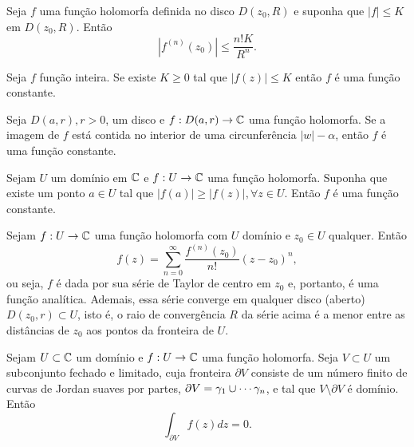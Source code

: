 \begin{corolario}
Seja $f$ uma função holomorfa definida no disco $D(z_0, R)$ e suponha que
$|f|\leq K$ em $D(z_0, R)$. Então
\begin{equation*}
    |f^{(n)}(z_0)| \leq \frac{n!K}{R^n}.
\end{equation*}
\end{corolario}


\begin{corolario}
Seja $f$ função inteira. Se existe $K\geq 0$ tal que $|f(z)|\leq K$ então $f$ é uma função constante.
\end{corolario}


\begin{lema}
Seja $D(a,r), r>0$, um disco e $f: D(a,r)\to\mathbb{C}$ uma função holomorfa. 
Se a imagem de $f$ está contida no interior de uma circunferência $|w| - \alpha$, então $f$ é uma função constante.
\end{lema}


\begin{corolario}
Sejam $U$ um domínio em $\mathbb{C}$ e $f:U\to\mathbb{C}$ uma função holomorfa.
Suponha que existe um ponto $a\in U$ tal que $|f(a)| \geq |f(z)|, \forall z\in U$. Então $f$ é uma função constante.
\end{corolario}


\begin{teorema}
Sejam $f:U\to\mathbb{C}$ uma função holomorfa com $U$ domínio e $z_0\in U$ qualquer.
Então
\begin{equation*}
    f(z) = \sum_{n=0}^{\infty} \frac{f^{(n)}(z_0)}{n!}(z-z_0)^n,
\end{equation*}
ou seja, $f$ é dada por sua série de Taylor de centro em $z_0$ e, portanto, é uma função analítica.
Ademais, essa série converge em qualquer disco (aberto) $D(z_0, r) \subset U$, isto é, o raio de convergência $R$ da série acima é a menor entre as distâncias de $z_0$ aos pontos da fronteira de $U$.
\end{teorema}


\begin{teorema}
\label{teo-cauchy}
Sejam $U\subset\mathbb{C}$ um domínio e $f:U\to\mathbb{C}$ uma função holomorfa. Seja $V\subset U$ um subconjunto fechado e limitado, cuja fronteira $\partial V$ consiste de um número finito de curvas de Jordan
suaves por partes, $\partial V = \gamma_1\cup\cdots\gamma_n$, e tal que
$V\setminus\partial V$ é domínio. Então
\begin{equation*}
    \int_{\partial V} f(z) dz = 0.
\end{equation*}
\end{teorema}

